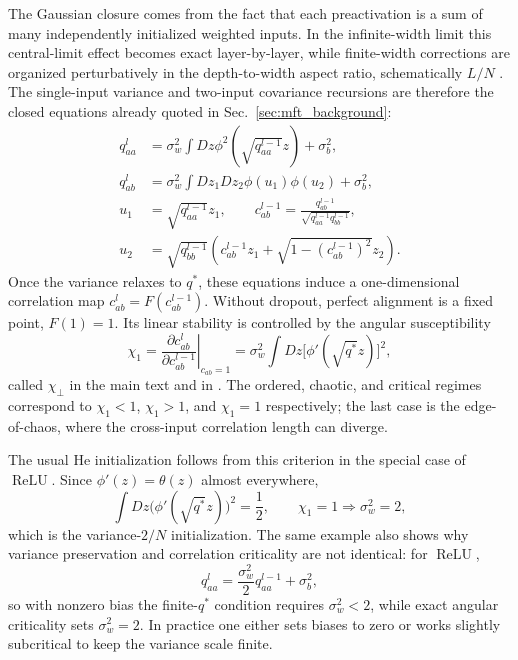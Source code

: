\documentclass{article}
\DeclareMathOperator{\ReLU}{ReLU}
\newcommand{\relu}{\ensuremath{\ReLU}}
\theoremstyle{plain}
\theoremstyle{definition}
\theoremstyle{remark}
\begin{document}
The Gaussian closure comes from the fact that each preactivation is a sum of many independently initialized weighted inputs. In the infinite-width limit this central-limit effect becomes exact layer-by-layer, while finite-width corrections are organized perturbatively in the depth-to-width aspect ratio, schematically $L/N$ \cite{roberts2022principlesdeeplearningtheory}. The single-input variance and two-input covariance recursions are therefore the closed equations already quoted in Sec.~\ref{sec:mft_background}:
\relax
\begin{align}
q^{l}_{aa}&=\sigma_{w}^{2}\int Dz \phi^{2}\left(\sqrt{q^{l-1}_{aa}} z\right)+\sigma_{b}^{2},\nonumber\\
q^{l}_{ab}&=\sigma_{w}^{2}\int Dz_{1} Dz_{2} \phi(u_{1}) \phi(u_{2})+\sigma_{b}^{2},\nonumber\\
u_{1}&=\sqrt{q^{l-1}_{aa}} z_{1},\qquad c^{l-1}_{ab}=\frac{q^{l-1}_{ab}}{\sqrt{q^{l-1}_{aa} q^{l-1}_{bb}}},\nonumber\\
u_{2}&=\sqrt{q^{l-1}_{bb}}\left(c^{l-1}_{ab}z_{1}+\sqrt{1-\left(c^{l-1}_{ab}\right)^{2}} z_{2}\right).
\end{align}
\relax
Once the variance relaxes to $q^*$, these equations induce a one-dimensional correlation map $c^l_{ab}=F(c^{l-1}_{ab})$. Without dropout, perfect alignment is a fixed point, $F(1)=1$. Its linear stability is controlled by the angular susceptibility
\relax
\begin{equation}
\chi_{1}=\left.\frac{\partial c^{l}_{ab}}{\partial c^{l-1}_{ab}}\right|_{c_{ab}=1}=\sigma_{w}^{2}\int Dz \big[\phi'(\sqrt{q^{*}} z)\big]^{2},
\end{equation}
\relax
called $\chi_\perp$ in the main text and in \cite{roberts2022principlesdeeplearningtheory}. The ordered, chaotic, and critical regimes correspond to $\chi_1<1$, $\chi_1>1$, and $\chi_1=1$ respectively; the last case is the edge-of-chaos, where the cross-input correlation length can diverge.

The usual He initialization follows from this criterion in the special case of \relu{}. Since $\phi'(z)=\theta(z)$ almost everywhere,
\relax
\begin{equation}
\int Dz \big(\phi'(\sqrt{q^{*}}z)\big)^2=\frac12,
\qquad \chi_1=1 \Longrightarrow \sigma_w^2=2,
\end{equation}
\relax
which is the variance-$2/N$ initialization. The same example also shows why variance preservation and correlation criticality are not identical: for \relu{},
\relax
\begin{equation}
q^{l}_{aa}=\frac{\sigma_w^2}{2} q^{l-1}_{aa}+\sigma_b^2,
\end{equation}
\relax
so with nonzero bias the finite-$q^*$ condition requires $\sigma_w^2<2$, while exact angular criticality sets $\sigma_w^2=2$. In practice one either sets biases to zero or works slightly subcritical to keep the variance scale finite.
\end{document}
